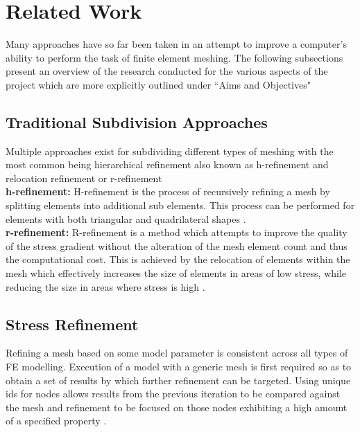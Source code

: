 \section{Related Work}
Many approaches have so far been taken in an attempt to improve a computer's ability to perform the task of finite element meshing. The following subsections present an overview of the research conducted for the various aspects of the project which are more explicitly outlined under ``Aims and Objectives"

\subsection{Traditional Subdivision Approaches}
Multiple approaches exist for subdividing different types of meshing with the most common being hierarchical refinement also known as h-refinement and relocation refinement or r-refinement\cite{HandPRefinements} \cite{RRefinement}\\ 

\noindent
\textbf{h-refinement: }
H-refinement is the process of recursively refining a mesh by splitting elements into additional sub elements. This process can be performed for elements with both triangular and quadrilateral shapes \cite{HandPRefinements}. \\ 

\noindent
\textbf{r-refinement: }
R-refinement is a method which attempts to improve the quality of the stress gradient without the alteration of the mesh element count and thus the computational cost. This is achieved by the relocation of elements within the mesh which effectively increases the size of elements in areas of low stress, while reducing the size in areas where stress is high \cite{RRefinement}.


\subsection{Stress Refinement}
Refining a mesh based on some model parameter is consistent across all types of FE modelling. Execution of a model with a generic mesh is first required so as to obtain a set of results by which further refinement can be targeted. Using unique ids for nodes allows results from the previous iteration to be compared against the mesh and refinement to be focused on those nodes exhibiting a high amount of a specified property \cite{FiniteElementMeshRefinement}.




